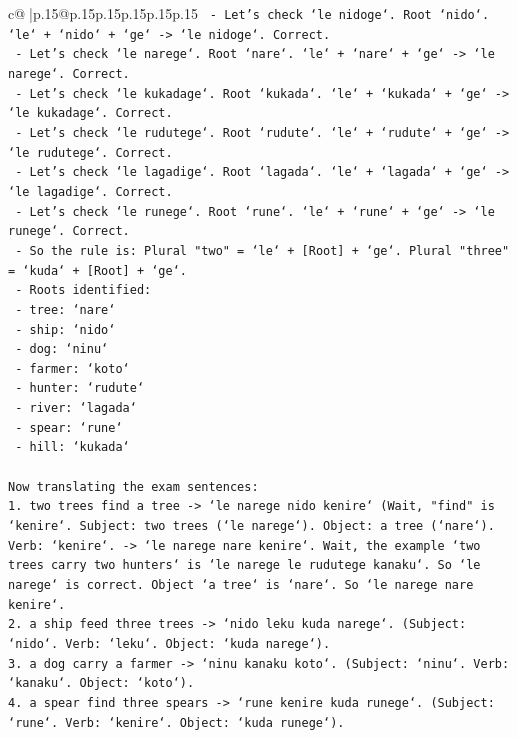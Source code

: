 \documentclass{article}
\begin{document}
{\begin{supertabular}{c@{$\;$}|p{.15\linewidth}@{}p{.15\linewidth}p{.15\linewidth}p{.15\linewidth}p{.15\linewidth}p{.15\linewidth}}
{{{\texttt{   {-} Let's check `le nidoge`. Root `nido`. `le` + `nido` + `ge` {-}> `le nidoge`. Correct.} \\
\texttt{   {-} Let's check `le narege`. Root `nare`. `le` + `nare` + `ge` {-}> `le narege`. Correct.} \\
\texttt{   {-} Let's check `le kukadage`. Root `kukada`. `le` + `kukada` + `ge` {-}> `le kukadage`. Correct.} \\
\texttt{   {-} Let's check `le rudutege`. Root `rudute`. `le` + `rudute` + `ge` {-}> `le rudutege`. Correct.} \\
\texttt{   {-} Let's check `le lagadige`. Root `lagada`. `le` + `lagada` + `ge` {-}> `le lagadige`. Correct.} \\
\texttt{   {-} Let's check `le runege`. Root `rune`. `le` + `rune` + `ge` {-}> `le runege`. Correct.} \\
\texttt{   {-} So the rule is: Plural "two" = `le` + {[}Root{]} + `ge`. Plural "three" = `kuda` + {[}Root{]} + `ge`.} \\
\texttt{   {-} Roots identified:} \\
\texttt{     {-} tree: `nare`} \\
\texttt{     {-} ship: `nido`} \\
\texttt{     {-} dog: `ninu`} \\
\texttt{     {-} farmer: `koto`} \\
\texttt{     {-} hunter: `rudute`} \\
\texttt{     {-} river: `lagada`} \\
\texttt{     {-} spear: `rune`} \\
\texttt{     {-} hill: `kukada`} \\
\\ 
\texttt{Now translating the exam sentences:} \\
\texttt{1. two trees find a tree {-}> `le narege nido kenire` (Wait, "find" is `kenire`. Subject: two trees (`le narege`). Object: a tree (`nare`). Verb: `kenire`. {-}> `le narege nare kenire`. Wait, the example `two trees carry two hunters` is `le narege le rudutege kanaku`. So `le narege` is correct. Object `a tree` is `nare`. So `le narege nare kenire`.} \\
\texttt{2. a ship feed three trees {-}> `nido leku kuda narege`. (Subject: `nido`. Verb: `leku`. Object: `kuda narege`).} \\
\texttt{3. a dog carry a farmer {-}> `ninu kanaku koto`. (Subject: `ninu`. Verb: `kanaku`. Object: `koto`).} \\
\texttt{4. a spear find three spears {-}> `rune kenire kuda runege`. (Subject: `rune`. Verb: `kenire`. Object: `kuda runege`).} \\
}}}
\end{supertabular}}
\end{document}
